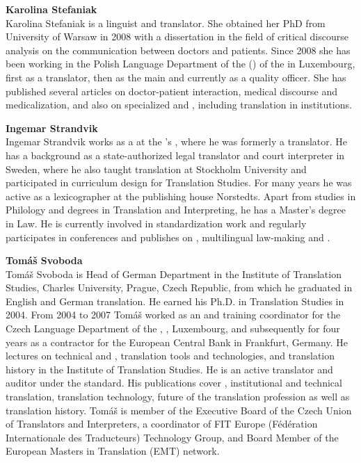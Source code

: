 \medskip\noindent
\textbf{Karolina Stefaniak }\\
Karolina Stefaniak is a linguist and translator. She obtained her PhD from University of Warsaw in 2008 with a dissertation in the field of critical discourse analysis on the communication between doctors and patients. Since 2008 she has been working in the Polish Language Department of the  () of the  in Luxembourg, first as a translator, then as the main  and currently as a quality officer. She has published several articles on doctor-patient interaction, medical discourse and medicalization, and also on specialized and , including translation in  institutions. 

\medskip\noindent
\textbf{Ingemar Strandvik }\\
Ingemar Strandvik works as a  at the ’s , where he was formerly a translator. He has a background as a state-authorized legal translator and court interpreter in Sweden, where he also taught translation at Stockholm University and participated in curriculum design for Translation Studies. For many years he was active as a lexicographer at the publishing house Norstedts. Apart from studies in Philology and degrees in Translation and Interpreting, he has a Master’s degree in  Law. He is currently involved in standardization work and regularly participates in conferences and publishes on , multilingual law-making and .

\medskip\noindent
\textbf{Tomáš Svoboda}\\
Tomáš Svoboda is Head of German Department in the Institute of Translation Studies, Charles University, Prague, Czech Republic, from which he graduated in English and German translation. He earned his Ph.D. in Translation Studies in 2004. From 2004 to 2007 Tomáš worked as an  and training coordinator for the Czech Language Department of the , , Luxembourg, and subsequently for four years as a contractor for the European Central Bank in Frankfurt, Germany. He lectures on technical and , translation tools and technologies, and translation history in the Institute of Translation Studies. He is an active translator and auditor under the   standard. His publications cover , institutional and technical translation, translation technology, future of the translation profession as well as translation history. Tomáš is member of the Executive Board of the Czech Union of Translators and Interpreters, a coordinator of FIT Europe (Fédération Internationale des Traducteurs) Technology Group, and Board Member of the European Masters in Translation (EMT) network.

